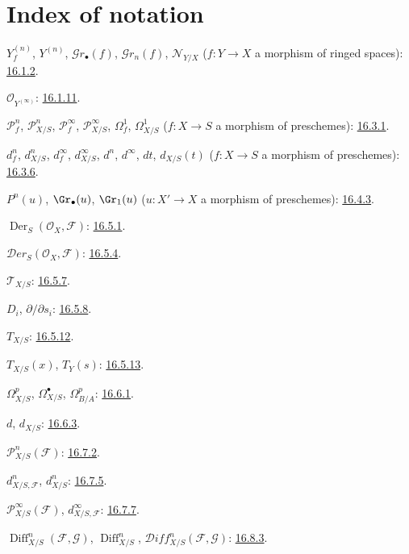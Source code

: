 \clearpage
{}
{}
\section*{Index of notation}

\begingroup
\small
\setlength{\parindent}{0pt}
\setlength{\parskip}{1.5pt}
\newcommand{\EGAIVidxref}[1]{\hyperref[IV.#1]{#1}}

$Y_f^{(n)}$, $Y^{(n)}$, $\mathcal{G}r_{\bullet}(f)$,
$\mathcal{G}r_n(f)$, $\mathcal{N}_{Y/X}$
($f:Y\to X$ a morphism of ringed spaces): \EGAIVidxref{16.1.2}.

$\mathcal{O}_{Y^{(\infty)}}$: \EGAIVidxref{16.1.11}.

$\mathcal{P}^{n}_{f}$, $\mathcal{P}^{n}_{X/S}$,
$\mathcal{P}^{\infty}_{f}$, $\mathcal{P}^{\infty}_{X/S}$,
$\Omega^{1}_{f}$, $\Omega^{1}_{X/S}$
($f:X\to S$ a morphism of preschemes): \EGAIVidxref{16.3.1}.

$d^{n}_{f}$, $d^{n}_{X/S}$, $d^{\infty}_{f}$,
$d^{\infty}_{X/S}$, $d^{n}$, $d^{\infty}$, $dt$, $d_{X/S}(t)$
($f:X\to S$ a morphism of preschemes): \EGAIVidxref{16.3.6}.

$P^{n}(u)$, $\Gr_{\bullet}(u)$, $\Gr_{1}(u)$
($u:X'\to X$ a morphism of preschemes): \EGAIVidxref{16.4.3}.

$\operatorname{Der}_{S}(\mathcal{O}_{X},\mathcal{F})$:
\EGAIVidxref{16.5.1}.

$\mathcal{D}er_{S}(\mathcal{O}_{X},\mathcal{F})$:
\EGAIVidxref{16.5.4}.

$\mathcal{T}_{X/S}$: \EGAIVidxref{16.5.7}.

$D_i$, $\partial/\partial s_i$: \EGAIVidxref{16.5.8}.

$T_{X/S}$: \EGAIVidxref{16.5.12}.

$T_{X/S}(x)$, $T_Y(s)$: \EGAIVidxref{16.5.13}.

$\Omega^p_{X/S}$, $\Omega^\bullet_{X/S}$, $\Omega^p_{B/A}$:
\EGAIVidxref{16.6.1}.

$d$, $d_{X/S}$: \EGAIVidxref{16.6.3}.

$\mathcal{P}^n_{X/S}(\mathcal{F})$: \EGAIVidxref{16.7.2}.

$d^n_{X/S,\mathcal{F}}$, $d^n_{X/S}$: \EGAIVidxref{16.7.5}.

$\mathcal{P}^{\infty}_{X/S}(\mathcal{F})$,
$d^{\infty}_{X/S,\mathcal{F}}$: \EGAIVidxref{16.7.7}.

$\operatorname{Diff}^{n}_{X/S}(\mathcal{F},\mathcal{G})$,
$\operatorname{Diff}^{n}_{X/S}$,
$\mathcal{D}iff^{n}_{X/S}(\mathcal{F},\mathcal{G})$:
\EGAIVidxref{16.8.3}.


